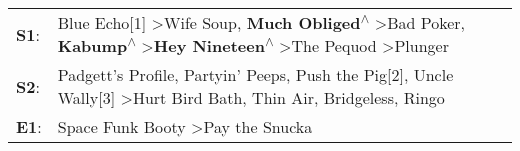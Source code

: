 \begin{supertabular}{p{0.03\textwidth}p{0.92\textwidth}}
 \textbf{S1}:  &  Blue Echo[1]\textsuperscript{} \textgreater \enspace Wife Soup\textsuperscript{}, \enspace \textbf{Much Obliged\textsuperscript{$\wedge$}} \textgreater \enspace Bad Poker\textsuperscript{}, \enspace \textbf{Kabump\textsuperscript{$\wedge$}} \textgreater \enspace \textbf{Hey Nineteen\textsuperscript{$\wedge$}} \textgreater \enspace The Pequod\textsuperscript{} \textgreater \enspace Plunger\textsuperscript{}  \enspace  \\
 \textbf{S2}:  &                                                                                 Padgett's Profile\textsuperscript{}, \enspace Partyin' Peeps\textsuperscript{}, \enspace Push the Pig[2]\textsuperscript{}, \enspace Uncle Wally[3]\textsuperscript{} \textgreater \enspace Hurt Bird Bath\textsuperscript{}, \enspace Thin Air\textsuperscript{}, \enspace Bridgeless\textsuperscript{}, \enspace Ringo\textsuperscript{}  \enspace  \\
 \textbf{E1}:  &                                                                                                                                                                                                                                                                                                                                  Space Funk Booty\textsuperscript{} \textgreater \enspace Pay the Snucka\textsuperscript{}  \enspace  \\
\end{supertabular}

